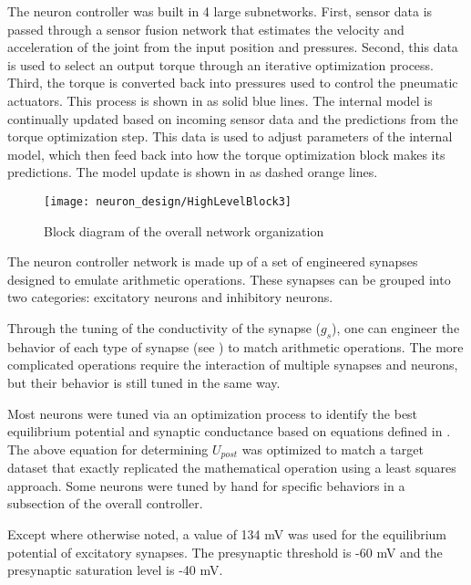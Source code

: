 The neuron controller was built in 4 large subnetworks. First, sensor data is passed through a sensor fusion network that estimates the velocity and acceleration of the joint from the input position and pressures. Second, this data is used to select an output torque through an iterative optimization process. Third, the torque is converted back into pressures used to control the pneumatic actuators. This process is shown in  as solid blue lines. The internal model is continually updated based on incoming sensor data and the predictions from the torque optimization step. This data is used to adjust parameters of the internal model, which then feed back into how the torque optimization block makes its predictions. The model update is shown in  as dashed orange lines.

\begin{figure}
\centering
\texttt{[image: neuron\_design/HighLevelBlock3]}
\caption{Block diagram of the overall network organization}
\label{fig:HighLevelBlock}
\end{figure}

\label{sec:key_synapses}

The neuron controller network is made up of a set of engineered synapses
designed to emulate arithmetic operations. These synapses can be grouped into two
categories: excitatory neurons and inhibitory neurons.

Through the tuning of the conductivity of the synapse ($g_{s}$), one can engineer the behavior of each type of synapse (see ) to match arithmetic operations. The more complicated operations require the interaction of multiple synapses and neurons, but their behavior is still tuned in the same way.

Most neurons were tuned
via an optimization process to identify the best equilibrium potential and
synaptic conductance based on equations defined in 
\cite{NickFunctionalSubnetwork}. The above equation for determining $U_{post}$ was optimized to match a target dataset that exactly replicated the mathematical operation using a least squares approach.
Some neurons were tuned by hand for specific behaviors in
a subsection of the overall controller.


Except where otherwise noted, a value of 134 mV was used for the equilibrium
potential of excitatory synapses. The presynaptic threshold is -60 mV and the presynaptic saturation
level is -40 mV.

